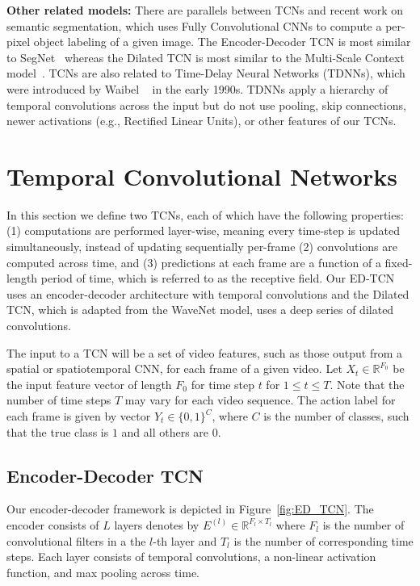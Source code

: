 \documentclass[10pt,twocolumn,letterpaper]{article}
\newcommand{\fakesubsection}[1]{\smallskip\noindent\textbf{#1:}}
\begin{document}
\fakesubsection{Other related models}
There are parallels between TCNs and recent work on semantic segmentation, which uses Fully Convolutional CNNs to compute a per-pixel object labeling of a given image. The Encoder-Decoder TCN is most similar to SegNet~\cite{badrinarayanan_arxiv_2015} whereas the Dilated TCN is most similar to the Multi-Scale Context model~\cite{yu_iclr_2016}. TCNs are also related to Time-Delay Neural Networks (TDNNs), which were introduced by Waibel \etal~\cite{Waibel_1990} in the early 1990s. TDNNs apply a hierarchy of temporal convolutions across the input but do not use pooling, skip connections, newer activations (e.g., Rectified Linear Units), or other features of our TCNs.




%
 \section{Temporal Convolutional Networks}
\label{sec:TCN}

In this section we define two TCNs, each of which have the following properties: (1) computations are performed layer-wise, meaning every time-step is updated simultaneously, instead of updating sequentially per-frame (2) convolutions are computed across time, and (3) predictions at each frame are a function of a fixed-length period of time, which is referred to as the receptive field. 
Our ED-TCN uses an encoder-decoder architecture with temporal convolutions and the Dilated TCN, which is adapted from the WaveNet model, uses a deep series of dilated convolutions.



The input to a TCN will be a set of video features, such as those output from a spatial or spatiotemporal CNN, for each frame of a given video.
Let $X_t \in \mathbb{R}^{F_0}$ be the input feature vector of length $F_0$ for time step $t$ for $1 \leq t \leq T$. Note that the number of time steps $T$ may vary for each video sequence.
The action label for each frame is given by vector
$Y_t \in \{0,1\}^C$, where $C$ is the number of classes, such that the true class is $1$ and all others are $0$.

\subsection{Encoder-Decoder TCN}
\label{sec:EDTCN}

Our encoder-decoder framework is depicted in Figure~\ref{fig:ED_TCN}.
The encoder consists of $L$ layers 
denotes by $E^{(l)} \in \mathbb{R}^{F_{l} \times T_{l}}$
where $F_{l}$ is the number of convolutional filters in a the $l$-th layer and $T_{l}$ is the number of corresponding time steps. 
Each layer consists of temporal convolutions, a non-linear activation function, and max pooling across time. 
\end{document}

